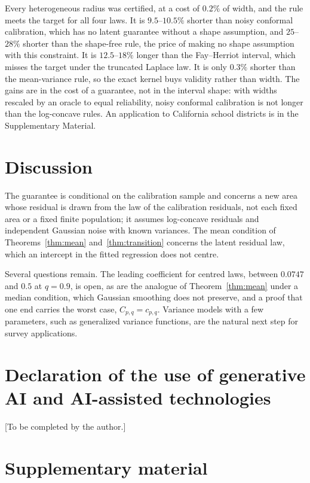 \documentclass[lineno]{biometrika}
\begin{document}
Every heterogeneous radius was certified, at a cost of $0.2\%$ of width, and the rule meets the target for all four laws. It is $9.5$--$10.5\%$ shorter than noisy conformal calibration, which has no latent guarantee without a shape assumption, and $25$--$28\%$ shorter than the shape-free rule, the price of making no shape assumption with this constraint. It is $12.5$--$18\%$ longer than the Fay--Herriot interval, which misses the target under the truncated Laplace law. It is only $0.3\%$ shorter than the mean-variance rule, so the exact kernel buys validity rather than width. The gains are in the cost of a guarantee, not in the interval shape: with widths rescaled by an oracle to equal reliability, noisy conformal calibration is not longer than the log-concave rules. An application to California school districts \citep{lumley2004} is in the Supplementary Material.

\section{Discussion}\label{sec:discussion}

The guarantee is conditional on the calibration sample and concerns a new area whose residual is drawn from the law of the calibration residuals, not each fixed area or a fixed finite population; it assumes log-concave residuals and independent Gaussian noise with known variances. The mean condition of Theorems~\ref{thm:mean} and~\ref{thm:transition} concerns the latent residual law, which an intercept in the fitted regression does not centre.

Several questions remain. The leading coefficient for centred laws, between $0.0747$ and $0.5$ at $q = 0.9$, is open, as are the analogue of Theorem~\ref{thm:mean} under a median condition, which Gaussian smoothing does not preserve, and a proof that one end carries the worst case, $C_{p,q} = c_{p,q}$. Variance models with a few parameters, such as generalized variance functions, are the natural next step for survey applications.

\section*{Declaration of the use of generative AI and AI-assisted technologies}

[To be completed by the author.]

\section*{Supplementary material}\label{SM}
\end{document}
